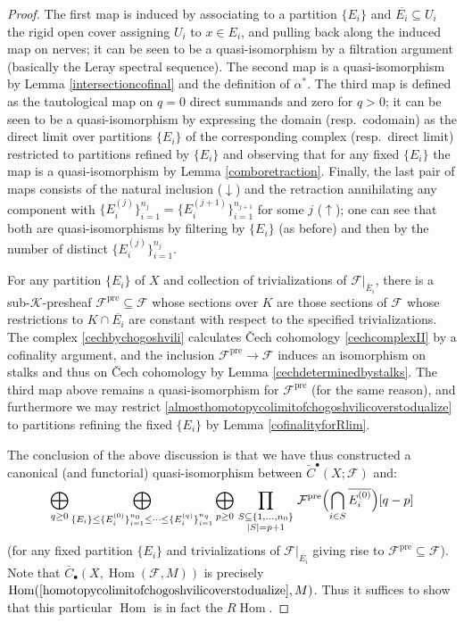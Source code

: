 \documentclass[12pt]{article}
\theoremstyle{definition}
\theoremstyle{remark}
\numberwithin{equation}{subsection}
\newcommand{\F}{\mathcal F}
\newcommand{\K}{\mathcal K}
\newcommand{\sC}{\overline C}
\newcommand{\cC}{\check C}
\newcommand{\Hom}{\operatorname{Hom}}
\newcommand{\pre}{\mathrm{pre}}
\begin{document}
\begin{proof}
The first map is induced by associating to a partition $\{E_i\}$ and $\overline{E_i}\subseteq U_i$ the rigid open cover assigning $U_i$ to $x\in E_i$, and pulling back along the induced map on nerves; it can be seen to be a quasi-isomorphism by a filtration argument (basically the Leray spectral sequence).  The second map is a quasi-isomorphism by Lemma \ref{intersectioncofinal} and the definition of $\alpha^\ast$.  The third map is defined as the tautological map on $q=0$ direct summands and zero for $q>0$; it can be seen to be a quasi-isomorphism by expressing the domain (resp.\ codomain) as the direct limit over partitions $\{E_i\}$ of the corresponding complex (resp.\ direct limit) restricted to partitions refined by $\{E_i\}$ and observing that for any fixed $\{E_i\}$ the map is a quasi-isomorphism by Lemma \ref{comboretraction}.  Finally, the last pair of maps consists of the natural inclusion ($\downarrow$) and the retraction annihilating any component with $\{E_i^{(j)}\}_{i=1}^{n_j}=\{E_i^{(j+1)}\}_{i=1}^{n_{j+1}}$ for some $j$ ($\uparrow$); one can see that both are quasi-isomorphisms by filtering by $\{E_i\}$ (as before) and then by the number of distinct $\{E_i^{(j)}\}_{i=1}^{n_j}$.

For any partition $\{E_i\}$ of $X$ and collection of trivializations of $\F|_{\overline E_i}$, there is a sub-$\K$-presheaf $\F^\pre\subseteq\F$ whose sections over $K$ are those sections of $\F$ whose restrictions to $K\cap\overline{E_i}$ are constant with respect to the specified trivializations.  The complex \eqref{cechbychogoshvili} calculates \v Cech cohomology \eqref{cechcomplexII} by a cofinality argument, and the inclusion $\F^\pre\to\F$ induces an isomorphism on stalks and thus on \v Cech cohomology by Lemma \ref{cechdeterminedbystalks}.  The third map above remains a quasi-isomorphism for $\F^\pre$ (for the same reason), and furthermore we may restrict \eqref{almosthomotopycolimitofchogoshvilicoverstodualize} to partitions refining the fixed $\{E_i\}$ by Lemma \ref{cofinalityforRlim}.

The conclusion of the above discussion is that we have thus constructed a canonical (and functorial) quasi-isomorphism between $\cC^\bullet(X;\F)$ and:
\begin{equation}
\label{homotopycolimitofchogoshvilicoverstodualize}\bigoplus_{q\geq 0}\bigoplus_{\{E_i\}\leq\{E_i^{(0)}\}_{i=1}^{n_0}\leq\cdots\leq\{E_i^{(q)}\}_{i=1}^{n_q}}\bigoplus_{p\geq 0}\prod_{\begin{smallmatrix}S\subseteq\{1,\ldots,n_0\}\cr\left|S\right|=p+1\end{smallmatrix}}\F^\pre\Bigl(\bigcap_{i\in S}\overline{E_i^{(0)}}\Bigr)[q-p]
\end{equation}
(for any fixed partition $\{E_i\}$ and trivializations of $\F|_{\overline{E_i}}$ giving rise to $\F^\pre\subseteq\F$).  Note that $\sC_\bullet(X,\Hom(\F,M))$ is precisely $\Hom(\eqref{homotopycolimitofchogoshvilicoverstodualize},M)$.  Thus it suffices to show that this particular $\Hom$ is in fact the $R\Hom$.


\end{proof}
\end{document}
